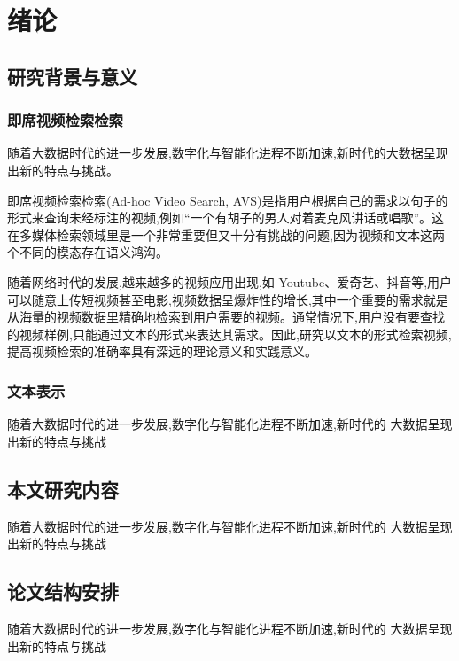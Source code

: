 \chapter{绪论}

\section{研究背景与意义}
\subsection{即席视频检索检索}
随着大数据时代的进一步发展,数字化与智能化进程不断加速,新时代的大数据呈现出新的特点与挑战。

即席视频检索检索(Ad-hoc Video Search, AVS)是指用户根据自己的需求以句子的形式来查询未经标注的视频,例如“一个有胡子的男人对着麦克风讲话或唱歌”。这在多媒体检索领域里是一个非常重要但又十分有挑战的问题,因为视频和文本这两个不同的模态存在语义鸿沟。

随着网络时代的发展,越来越多的视频应用出现,如 Youtube、爱奇艺、抖音等,用户可以随意上传短视频甚至电影,视频数据呈爆炸性的增长,其中一个重要的需求就是从海量的视频数据里精确地检索到用户需要的视频。通常情况下,用户没有要查找的视频样例,只能通过文本的形式来表达其需求。因此,研究以文本的形式检索视频,提高视频检索的准确率具有深远的理论意义和实践意义。


\subsection{文本表示}
随着大数据时代的进一步发展,数字化与智能化进程不断加速,新时代的
大数据呈现出新的特点与挑战
\section{本文研究内容}
随着大数据时代的进一步发展,数字化与智能化进程不断加速,新时代的
大数据呈现出新的特点与挑战
\section{论文结构安排}
随着大数据时代的进一步发展,数字化与智能化进程不断加速,新时代的
大数据呈现出新的特点与挑战

